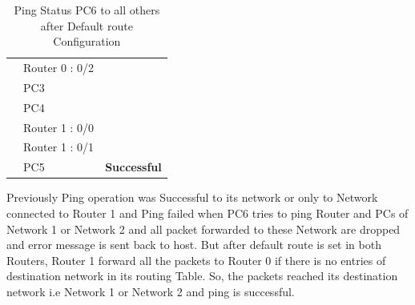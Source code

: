 \documentclass[a4paper,11pt]{article}
\begin{document}
\begin{enumerate}
\begin{itemize}
\begin{table}[H]
\begin{tabular}{| m{10em}| m{10em}| m{10em} |}
                            {\cellcolor[rgb]{0.141,0.525,1}}                                & Router 0 : 0/2       & {\cellcolor[rgb]{0.42,0.988,0.827}}                                        \\
                            \hhline{|>{\arrayrulecolor[rgb]{0.141,0.525,1}}->{\arrayrulecolor{black}}->{\arrayrulecolor[rgb]{0.42,0.988,0.827}}->{\arrayrulecolor{black}}|}
                            {\cellcolor[rgb]{0.141,0.525,1}}                                & PC3                  & {\cellcolor[rgb]{0.42,0.988,0.827}}                                        \\
                            \hhline{|>{\arrayrulecolor[rgb]{0.141,0.525,1}}->{\arrayrulecolor{black}}->{\arrayrulecolor[rgb]{0.42,0.988,0.827}}->{\arrayrulecolor{black}}|}
                            {\cellcolor[rgb]{0.141,0.525,1}}                                & PC4                  & {\cellcolor[rgb]{0.42,0.988,0.827}}                                        \\
                            \hhline{|>{\arrayrulecolor[rgb]{0.141,0.525,1}}->{\arrayrulecolor{black}}->{\arrayrulecolor[rgb]{0.42,0.988,0.827}}->{\arrayrulecolor{black}}|}
                            {\cellcolor[rgb]{0.141,0.525,1}}                                & Router 1 : 0/0       & {\cellcolor[rgb]{0.42,0.988,0.827}}                                        \\
                            \hhline{|>{\arrayrulecolor[rgb]{0.141,0.525,1}}->{\arrayrulecolor{black}}->{\arrayrulecolor[rgb]{0.42,0.988,0.827}}->{\arrayrulecolor{black}}|}
                            {\cellcolor[rgb]{0.141,0.525,1}}                                & Router 1 : 0/1       & {\cellcolor[rgb]{0.42,0.988,0.827}}                                        \\
                            \hhline{|>{\arrayrulecolor[rgb]{0.141,0.525,1}}->{\arrayrulecolor{black}}->{\arrayrulecolor[rgb]{0.42,0.988,0.827}}->{\arrayrulecolor{black}}|}
                            \multirow{-10}{*}{{\cellcolor[rgb]{0.141,0.525,1}}\textbf{PC6}} & PC5                  & \multirow{-10}{*}{{\cellcolor[rgb]{0.42,0.988,0.827}} \textbf{Successful}} \\
                            \hline
                        \end{tabular}
                        \caption{ Ping Status PC6 to all others after Default route Configuration}
                    \end{table}

                    Previously Ping operation was Successful to its network or only to Network connected to  Router 1 and  Ping failed when PC6 tries to ping Router and PCs of Network 1 or Network 2 and all packet forwarded to these Network are dropped and error message is sent back to host. But after default route is set in both Routers, Router 1 forward all the packets to Router 0 if there is no entries of destination network in its routing Table. So, the packets reached its destination network i.e Network 1 or Network 2 and ping is successful.


\end{itemize}
\end{enumerate}
\end{document}
